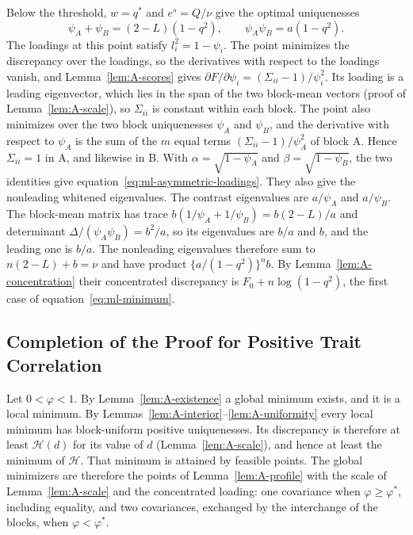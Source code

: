 Below the threshold, $w=q^*$ and $e^s=Q/\nu$ give the optimal uniquenesses
\[
\psi_A+\psi_B=(2-L)(1-q^2),\qquad \psi_A\psi_B=a(1-q^2).
\]
The loadings at this point satisfy $l_i^2=1-\psi_i$. The point minimizes the discrepancy over the loadings, so the derivatives with respect to the loadings vanish, and Lemma~\ref{lem:A-scores} gives $\partial F/\partial\psi_i=(\Sigma_{ii}-1)/\psi_i^2$. Its loading is a leading eigenvector, which lies in the span of the two block-mean vectors (proof of Lemma~\ref{lem:A-scale}), so $\Sigma_{ii}$ is constant within each block. The point also minimizes over the two block uniquenesses $\psi_A$ and $\psi_B$, and the derivative with respect to $\psi_A$ is the sum of the $m$ equal terms $(\Sigma_{ii}-1)/\psi_A^2$ of block A. Hence $\Sigma_{ii}=1$ in A, and likewise in B. With $\alpha=\sqrt{1-\psi_A}$ and $\beta=\sqrt{1-\psi_B}$, the two identities give equation~\eqref{eq:ml-asymmetric-loadings}. They also give the nonleading whitened eigenvalues. The contrast eigenvalues are $a/\psi_A$ and $a/\psi_B$. The block-mean matrix has trace $b(1/\psi_A+1/\psi_B)=b(2-L)/a$ and determinant $\Delta/(\psi_A\psi_B)=b^2/a$, so its eigenvalues are $b/a$ and $b$, and the leading one is $b/a$. The nonleading eigenvalues therefore sum to $n(2-L)+b=\nu$ and have product $\{a/(1-q^2)\}^n b$. By Lemma~\ref{lem:A-concentration} their concentrated discrepancy is $F_0+n\log(1-q^2)$, the first case of equation~\eqref{eq:ml-minimum}.

\subsection{Completion of the Proof for Positive Trait Correlation}

Let $0<\varphi<1$. By Lemma~\ref{lem:A-existence} a global minimum exists, and it is a local minimum. By Lemmas~\ref{lem:A-interior}--\ref{lem:A-uniformity} every local minimum has block-uniform positive uniquenesses. Its discrepancy is therefore at least $\mathcal H(d)$ for its value of $d$ (Lemma~\ref{lem:A-scale}), and hence at least the minimum of $\mathcal H$. That minimum is attained by feasible points. The global minimizers are therefore the points of Lemma~\ref{lem:A-profile} with the scale of Lemma~\ref{lem:A-scale} and the concentrated loading: one covariance when $\varphi\ge\varphi^*$, including equality, and two covariances, exchanged by the interchange of the blocks, when $\varphi<\varphi^*$.


